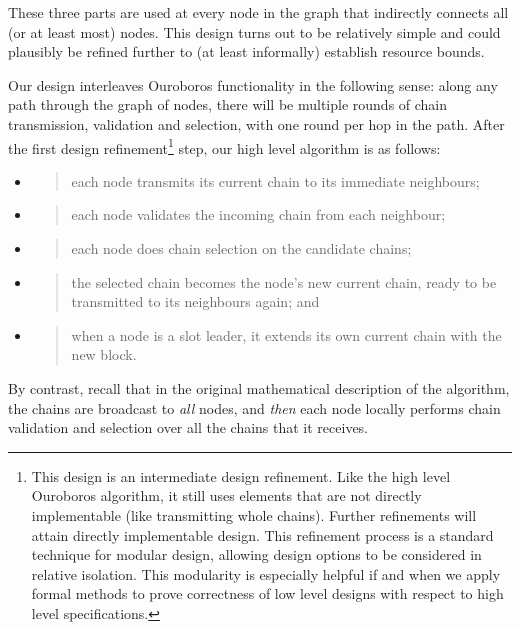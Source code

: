 \documentclass[]{article}
\begin{document}
These three parts are used at every node in the graph that indirectly
connects all (or at least most) nodes. This design turns out to be
relatively simple and could plausibly be refined further to (at least
informally) establish resource bounds.

Our design interleaves Ouroboros functionality in the following sense:
along any path through the graph of nodes, there will be multiple rounds
of chain transmission, validation and selection, with one round per hop
in the path. After the first design refinement\footnote{This design is
  an intermediate design refinement. Like the high level Ouroboros
  algorithm, it still uses elements that are not directly implementable
  (like transmitting whole chains). Further refinements will attain
  directly implementable design. This refinement process is a standard
  technique for modular design, allowing design options to be considered
  in relative isolation. This modularity is especially helpful if and
  when we apply formal methods to prove correctness of low level designs
  with respect to high level specifications.} step, our high level
algorithm is as follows:

\begin{itemize}
\item
  \begin{quote}
  each node transmits its current chain to its immediate neighbours;
  \end{quote}
\item
  \begin{quote}
  each node validates the incoming chain from each neighbour;
  \end{quote}
\item
  \begin{quote}
  each node does chain selection on the candidate chains;
  \end{quote}
\item
  \begin{quote}
  the selected chain becomes the node's new current chain, ready to be
  transmitted to its neighbours again; and
  \end{quote}
\item
  \begin{quote}
  when a node is a slot leader, it extends its own current chain with
  the new block.
  \end{quote}
\end{itemize}

By contrast, recall that in the original mathematical description of the
algorithm, the chains are broadcast to \emph{all} nodes, and \emph{then}
each node locally performs chain validation and selection over all the
chains that it receives.
\end{document}
